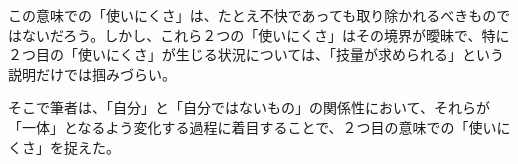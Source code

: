 この意味での「使いにくさ」は、たとえ不快であっても取り除かれるべきものではないだろう。しかし、これら２つの「使いにくさ」はその境界が曖昧で、特に２つ目の「使いにくさ」が生じる状況については、「技量が求められる」という説明だけでは掴みづらい。

そこで筆者は、「自分」と「自分ではないもの」の関係性において、それらが「一体」となるよう変化する過程に着目することで、２つ目の意味での「使いにくさ」を捉えた。



